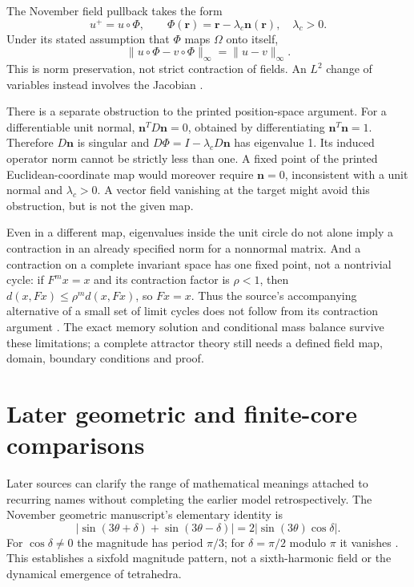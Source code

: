 \documentclass[11pt,a4paper]{article}
\theoremstyle{definition}
\numberwithin{equation}{section}
\begin{document}
The November field pullback takes the form
\begin{equation}
 u^+=u\circ\Phi,\qquad
 \Phi(\mathbf r)=\mathbf r-\lambda_c\mathbf n(\mathbf r),
 \quad \lambda_c>0.
 \label{eq:normal-map}
\end{equation}
Under its stated assumption that $\Phi$ maps $\Omega$ onto itself,
\[
 \|u\circ\Phi-v\circ\Phi\|_\infty=\|u-v\|_\infty.
\]
This is norm preservation, not strict contraction of fields.
An $L^2$ change of variables instead involves the Jacobian
\cite[physical p.~16, Eqs.~(17)--(18)]{P14}.

There is a separate obstruction to the printed position-space argument.
For a differentiable unit normal,
$\mathbf n^TD\mathbf n=0$, obtained by differentiating
$\mathbf n^T\mathbf n=1$. Therefore $D\mathbf n$ is singular and
$D\Phi=I-\lambda_cD\mathbf n$ has eigenvalue 1. Its induced operator
norm cannot be strictly less than one. A fixed point of the printed
Euclidean-coordinate map would moreover require $\mathbf n=0$,
inconsistent with a unit normal and $\lambda_c>0$.
A vector field vanishing at the target might avoid this obstruction,
but is not the given map.

Even in a different map, eigenvalues inside the unit circle do not alone
imply a contraction in an already specified norm for a nonnormal matrix.
And a contraction on a complete invariant space has one fixed point,
not a nontrivial cycle: if $F^mx=x$ and its contraction factor is $\rho<1$,
then $d(x,Fx)\leq\rho^m d(x,Fx)$, so $Fx=x$.
Thus the source's accompanying alternative of a small set of limit cycles
does not follow from its contraction argument
\cite[physical pp.~16--18]{P14}.
The exact memory solution and conditional mass balance survive these
limitations; a complete attractor theory still needs a defined field map,
domain, boundary conditions and proof.


\section{Later geometric and finite-core comparisons}
\label{sec:later}

Later sources can clarify the range of mathematical meanings attached to
recurring names without completing the earlier model retrospectively.
The November geometric manuscript's elementary identity is
\begin{equation}
 |\sin(3\theta+\delta)+\sin(3\theta-\delta)|
 =2|\sin(3\theta)\cos\delta|.
 \label{eq:sixfold}
\end{equation}
For $\cos\delta\ne0$ the magnitude has period $\pi/3$; for
$\delta=\pi/2$ modulo $\pi$ it vanishes
\cite[physical p.~11, \S4.4]{P14}.
This establishes a sixfold magnitude pattern, not a sixth-harmonic field
or the dynamical emergence of tetrahedra.
\end{document}
